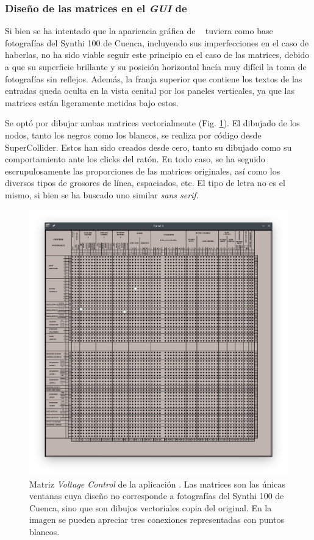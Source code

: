 \subsubsection[]{Diseño de las matrices en el \textit{GUI} de  \appName}
Si bien se ha intentado que la apariencia gráfica de \appName~ tuviera como base fotografías del Synthi 100 de Cuenca, incluyendo sus imperfecciones en el caso de haberlas, no ha sido viable seguir este principio en el caso de las matrices, debido a que su superficie brillante y su posición horizontal hacía muy difícil la toma de fotografías sin reflejos. Además, la franja superior que contiene los textos de las entradas queda oculta en la vista cenital por los paneles verticales, ya que las matrices están ligeramente metidas bajo estos.

Se optó por dibujar ambas matrices vectorialmente (Fig. \ref{fig:matriz_control_synthigme}). El dibujado de los nodos, tanto los negros como los blancos, se realiza por código desde SuperCollider. Estos han sido creados desde cero, tanto su dibujado como su comportamiento ante los clicks del ratón. En todo caso, se ha seguido escrupulosamente las proporciones de las matrices originales, así como los diversos tipos de grosores de línea, espaciados, etc.  El tipo de letra no es el mismo, si bien se ha buscado uno similar \textit{sans serif}.

\begin{figure}
	\centering
	\includegraphics[width=1\textwidth]{images/matriz_control_synthigme}
	\caption[Matriz \textit{Voltage Control} de la aplicación \appName]{Matriz \textit{Voltage Control} de la aplicación \appName. Las matrices son las únicas ventanas cuya diseño no corresponde a fotografías del Synthi 100 de Cuenca, sino que son dibujos vectoriales copia del original. En la imagen se pueden apreciar tres conexiones representadas con puntos blancos.}
	\label{fig:matriz_control_synthigme}
\end{figure}

